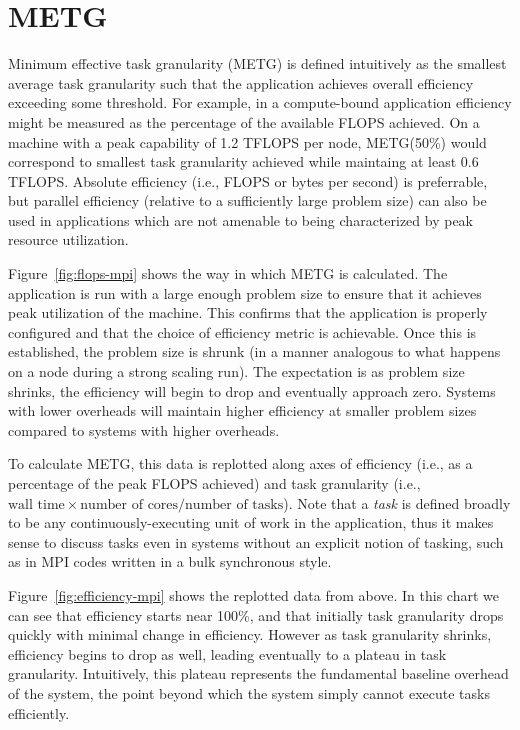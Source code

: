 \section{METG}
\label{sec:metg}




Minimum effective task granularity (METG) is defined intuitively as
the smallest average task granularity such that the application
achieves overall efficiency exceeding some threshold. For example, in
a compute-bound application efficiency might be measured as the
percentage of the available FLOPS achieved. On a machine with a peak
capability of 1.2 TFLOPS per node, METG(50\%) would correspond to
smallest task granularity achieved while maintaing at least 0.6
TFLOPS. Absolute efficiency (i.e., FLOPS or bytes per second) is
preferrable, but parallel efficiency (relative to a sufficiently large
problem size) can also be used in applications which are not amenable
to being characterized by peak resource utilization.

Figure~\ref{fig:flops-mpi} shows the way in which METG is
calculated. The application is run with a large enough problem size to
ensure that it achieves peak utilization of the machine. This confirms
that the application is properly configured and that the choice of
efficiency metric is achievable. Once this is established, the problem
size is shrunk (in a manner analogous to what happens on a node during
a strong scaling run). The expectation is as problem size shrinks, the
efficiency will begin to drop and eventually approach zero. Systems
with lower overheads will maintain higher efficiency at smaller
problem sizes compared to systems with higher overheads.

To calculate METG, this data is replotted along axes of efficiency
(i.e., as a percentage of the peak FLOPS achieved) and task
granularity (i.e., $\text{wall time} \times \text{number of
  cores}/\text{number of tasks}$). Note that a \emph{task} is defined
broadly to be any continuously-executing unit of work in the
application, thus it makes sense to discuss tasks even in systems
without an explicit notion of tasking, such as in MPI codes written in
a bulk synchronous style.

Figure~\ref{fig:efficiency-mpi}
shows the replotted data from above. In this chart we can see that
efficiency starts near 100\%, and that initially task granularity
drops quickly with minimal change in efficiency. However as task
granularity shrinks, efficiency begins to drop as well, leading
eventually to a plateau in task granularity. Intuitively, this plateau
represents the fundamental baseline overhead of the system, the point
beyond which the system simply cannot execute tasks efficiently.

